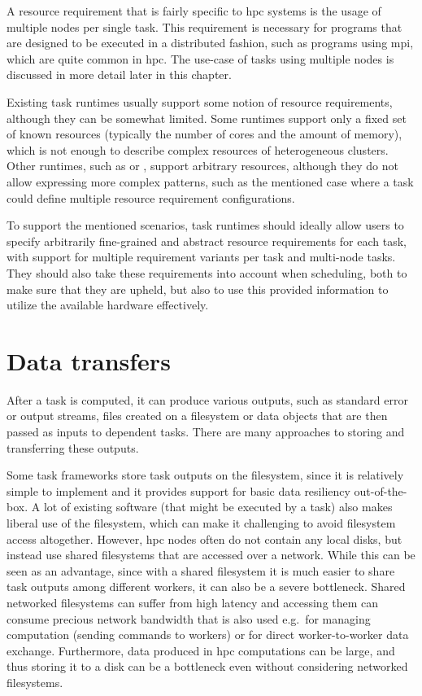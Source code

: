A resource requirement that is fairly specific to \gls{hpc} systems is the usage
of multiple nodes per single task. This requirement is necessary for programs that are designed to
be executed in a distributed fashion, such as programs using \gls{mpi}, which are
quite common in \gls{hpc}. The use-case of tasks using multiple nodes is
discussed in more detail later in this chapter.

Existing task runtimes usually support some notion of resource requirements, although they can be
somewhat limited. Some runtimes support only a fixed set of known resources (typically the number
of cores and the amount of memory), which is not enough to describe complex resources of
heterogeneous clusters. Other runtimes, such as \dask{} or
\snakemake{}, support arbitrary resources, although they do not allow expressing
more complex patterns, such as the mentioned case where a task could define multiple resource
requirement configurations.

To support the mentioned scenarios, task runtimes should ideally allow users to specify arbitrarily
fine-grained and abstract resource requirements for each task, with support for multiple
requirement variants per task and multi-node tasks. They should also take these requirements into
account when scheduling, both to make sure that they are upheld, but also to use this provided
information to utilize the available hardware effectively.

\section{Data transfers}
After a task is computed, it can produce various outputs, such as standard error or output streams,
files created on a filesystem or data objects that are then passed as inputs to dependent tasks.
There are many approaches to storing and transferring these outputs.

Some task frameworks store task outputs on the filesystem, since it is relatively simple to
implement and it provides support for basic data resiliency out-of-the-box. A lot of existing
software (that might be executed by a task) also makes liberal use of the filesystem, which can
make it challenging to avoid filesystem access altogether. However, \gls{hpc}
nodes often do not contain any local disks, but instead use shared filesystems that are accessed
over a network. While this can be seen as an advantage, since with a shared filesystem it is much
easier to share task outputs among different workers, it can also be a severe bottleneck. Shared
networked filesystems can suffer from high latency and accessing them can consume precious network
bandwidth that is also used e.g.\ for managing computation (sending commands to workers) or for
direct worker-to-worker data exchange. Furthermore, data produced in \gls{hpc}
computations can be large, and thus storing it to a disk can be a bottleneck even without
considering networked filesystems.

